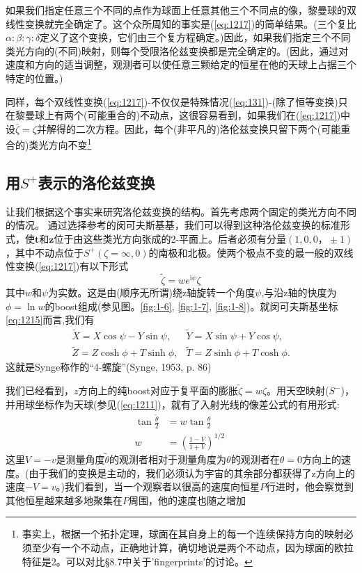 \documentclass[utf8]{ctexbook}
\numberwithin{equation}{section}
\begin{document}
如果我们指定任意三个不同的点作为球面上任意其他三个不同点的像，黎曼球的双线性变换就完全确定了。这个众所周知的事实是(\ref{eq:1217})的简单结果。(三个复比$\alpha:\beta:\gamma:\delta$定义了这个变换，它们由三个复方程确定。)因此，如果我们指定三个不同类光方向的(不同)映射，则每个受限洛伦兹变换都是完全确定的。(因此，通过对速度和方向的适当调整，观测者可以使任意三颗给定的恒星在他的天球上占据三个特定的位置。)

同样，每个双线性变换(\ref{eq:1217})-不仅仅是特殊情况(\ref{eq:131})-(除了恒等变换)只在黎曼球上有两个(可能重合的)不动点，这很容易看到，如果我们在(\ref{eq:1217})中设$\bar{\zeta}=\zeta$并解得的二次方程。因此，每个(非平凡的)洛伦兹变换只留下两个(可能重合的)类光方向不变\footnote{
事实上，根据一个拓扑定理，球面在其自身上的每一个连续保持方向的映射必须至少有一个不动点，正确地计算，确切地说是两个不动点，因为球面的欧拉特征是2。可以对比\S 8.7中关于'fingerprints'的讨论。}

\subsection*{用$S^+$表示的洛伦兹变换}
让我们根据这个事实来研究洛伦兹变换的结构。首先考虑两个固定的类光方向不同的情况。
通过选择参考的闵可夫斯基基，我们可以得到这种洛伦兹变换的标准形式，使$\mathbf{t}$和$\mathbf{z}$位于由这些类光方向张成的2-平面上。后者必须有分量$(1,0,0，\pm 1)$，其中不动点位于$S^+ (\zeta=\infty, 0)$的南极和北极。使两个极点不变的最一般的双线性变换(\ref{eq:1217})有以下形式
\begin{equation}
    \tilde{\zeta}=we^{\mathrm{i}\psi }\zeta
\end{equation}
其中$w$和$\psi$为实数。这是由(顺序无所谓)绕z轴旋转一个角度$\psi$,与沿z轴的快度为$\phi=\ln w$的boost组成(参见图。\ref{fig:1-6}, \ref{fig:1-7}, \ref{fig:1-8})。就闵可夫斯基坐标\ref{eq:1215}而言,我们有
\begin{align}
    \tilde{X}=X \cos\psi-Y\sin\psi,&\tilde{Y}=X \sin\psi+Y\cos\psi,\nonumber\\
    \tilde{Z}=Z \cosh\phi+T\sinh\phi,&\tilde{T}=Z \sinh\phi+T\cosh\phi.
\end{align}
这就是Synge称作的“4-螺旋”(Synge, 1953, p. 86)

我们已经看到，$z$方向上的纯boost对应于复平面的膨胀$\tilde{\zeta}=w\zeta$。用天空映射($S^-$)，并用球坐标作为天球(参见(\ref{eq:1211})，就有了入射光线的像差公式的有用形式:
\begin{align}
    \tan{\frac{\tilde{\theta}}{2}}&=w\tan{\frac{\theta}{2}}\nonumber\\
    w&=(\frac{1-V}{1+V})^{1/2}\
\end{align}
这里$V=-v$是测量角度$\tilde{\theta}$的观测者相对于测量角度为$\theta$的观测者在$\theta=0$方向上的速度。(由于我们的变换是主动的，我们必须认为宇宙的其余部分都获得了z方向上的速度$- V = v$。)我们看到，当一个观察者以很高的速度向恒星$P$行进时，他会察觉到其他恒星越来越多地聚集在$P$周围，他的速度也随之增加
\end{document}
